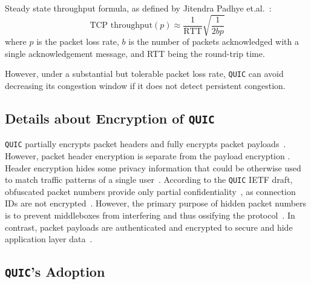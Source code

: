 \documentclass[12pt,a4paper,twoside,openright]{report}
\newcommand\note[2]{{\color{#1}\bf #2}}
\newcommand\simon[1]{\ifcomments{\note{cyan}{SM: #1}}\fi}
\begin{document}
\begin{itemize}
  Steady state throughput formula, as defined by Jitendra Padhye et.al.~\cite{TCP_throughput_formula}: 
    \begin{equation}
    \textrm{TCP throughput} (p) \approx \frac{1}{\textrm{RTT}}\sqrt{\frac{1}{2bp}} 
    \label{eq:gass_stuff}
    \end{equation}
     where $p$ is the packet loss rate, $b$ is the number of packets acknowledged with a single acknowledgement message, and RTT being the round-trip time.
  
  
  However, under a substantial but tolerable packet loss rate, \texttt{QUIC} can avoid decreasing its congestion window if it does not detect persistent congestion.
  
  
\end{itemize}



\subsection{Details about Encryption of \texttt{QUIC}} \label{subsection_QUIC_header_format}


\texttt{QUIC} partially encrypts packet headers and fully encrypts packet payloads~\cite{the-road-to-quic}.
However, packet header encryption is separate from the payload encryption
\simon{TODO: FIND SOURCE}.
Header encryption hides some privacy information that could be otherwise used to match traffic patterns of a single user~\cite{2017-12-18-transport-header-encryption, the-road-to-quic}.
According to the \texttt{QUIC} IETF draft, obfuscated packet numbers provide only partial confidentiality~\cite{ietf-quic-transport-draft-32}, as connection IDs are not encrypted~\cite[Section~5.4.1]{ietf-quic-tls-32}.
However, the primary purpose of hidden packet numbers is to prevent middleboxes from interfering and thus ossifying the protocol~\cite{the-road-to-quic}.
In contrast, packet payloads are authenticated and encrypted to secure and hide application layer data~\cite{ietf-quic-tls-32}.

  
  
\subsection{\texttt{QUIC}'s Adoption}
\end{document}
